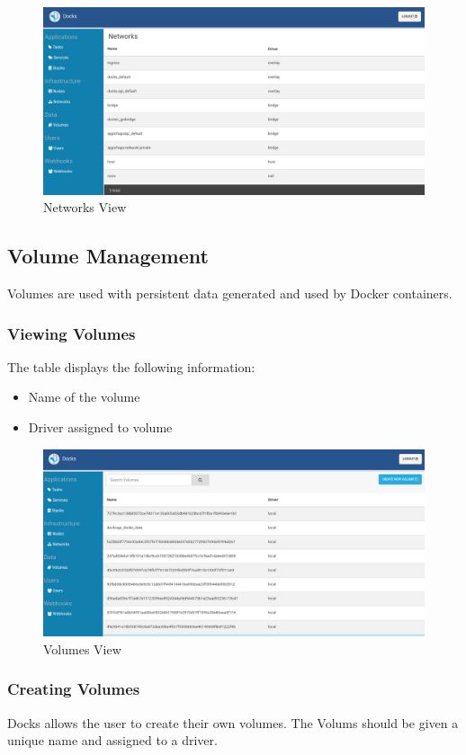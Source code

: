 \documentclass[]{article}
\providecommand{\tightlist}{%
	\setlength{\itemsep}{0pt}\setlength{\parskip}{0pt}}
\begin{document}
\begin{figure}[H]
	\centering
	\includegraphics[scale=0.4]{networks.png}
	\caption{Networks View}
\end{figure}


\subsection{Volume Management}
Volumes are used with persistent data generated and used by Docker containers.

\subsubsection{Viewing Volumes}
The table displays the following information:
\begin{itemize}
	\tightlist
	\item Name of the volume
	\item Driver assigned to volume
\end{itemize}

\begin{figure}[H]
	\centering
	\includegraphics[scale=0.4]{volumes.png}
	\caption{Volumes View}
\end{figure}

\subsubsection{Creating Volumes}
Docks allows the user to create their own volumes. 
The Volums should be given a unique name and assigned to a driver.
\end{document}
